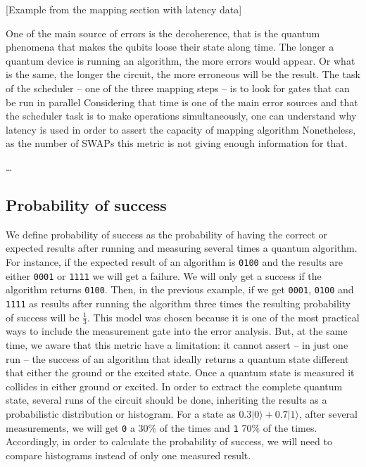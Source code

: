 [Example from the mapping section with latency data]

One of the main source of errors is the decoherence, that is the quantum phenomena that makes the qubits loose their state along time.
The longer a quantum device is running an algorithm, the more errors would appear.
Or what is the same, the longer the circuit, the more erroneous will be the result.
The task of the scheduler -- one of the three mapping steps -- is to look for gates that can be run in parallel
Considering that time is one of the main error sources and that the scheduler task is to make operations simultaneously, one can understand why latency is used in order to assert the capacity of mapping algorithm
Nonetheless, as the number of SWAPs this metric is not giving enough information for that.

\ldots{}

\subsection*{Probability of success}
\label{sec:org972074e}

We define probability of success as the probability of having the correct or expected results after running and measuring several times a quantum algorithm.
For instance, if the expected result of an algorithm is \texttt{0100} and the results are either \texttt{0001} or \texttt{1111} we will get a failure.
We will only get a success if the algorithm returns \texttt{0100}.
Then, in the previous example, if we get \texttt{0001}, \texttt{0100} and \texttt{1111} as results after running the algorithm three times the resulting probability of success will be \(\frac{1}{3}\).
This model was chosen because it is one of the most practical ways to include the measurement gate into the error analysis.
But, at the same time, we aware that this metric have a limitation: it cannot assert -- in just one run -- the success of an algorithm that ideally returns a quantum state different that either the ground or the excited state.
Once a quantum state is measured it collides in either ground or excited.
In order to extract the complete quantum state, several runs of the circuit should be done, inheriting the results as a probabilistic distribution or histogram.
For a state as \(0.3 | 0 \rangle + 0.7 | 1 \rangle\), after several measurements, we will get \texttt{0} a 30\% of the times and \texttt{1} 70\% of the times.
Accordingly, in order to calculate the probability of success, we will need to compare histograms instead of only one measured result.


